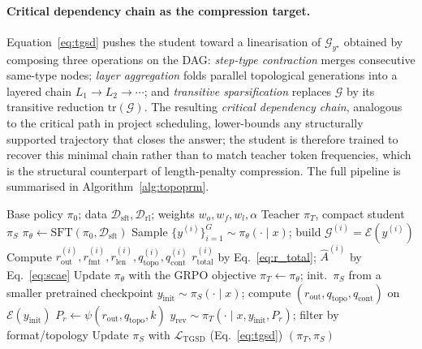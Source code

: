 \paragraph{Critical dependency chain as the compression target.}
Equation~\eqref{eq:tgsd} pushes the student toward a linearisation of $\mathcal{G}_{y^{\star}}$ obtained by composing three operations on the DAG: \emph{step-type contraction} merges consecutive same-type nodes; \emph{layer aggregation} folds parallel topological generations into a layered chain $L_1\!\to\!L_2\!\to\!\cdots$; and \emph{transitive sparsification} replaces $\mathcal{G}$ by its transitive reduction $\mathrm{tr}(\mathcal{G})$. The resulting \emph{critical dependency chain}, analogous to the critical path in project scheduling, lower-bounds any structurally supported trajectory that closes the answer; the student is therefore trained to recover this minimal chain rather than to match teacher token frequencies, which is the structural counterpart of length-penalty compression. The full \method pipeline is summarised in Algorithm~\ref{alg:topoprm}.

\begin{algorithm}[t]
\small
\caption{\framework Training Pipeline}
\label{alg:topoprm}
\begin{algorithmic}[1]
\Require Base policy $\pi_0$; data $\mathcal{D}_{\mathrm{sft}},\mathcal{D}_{\mathrm{rl}}$; weights $w_o,w_f,w_l,\alpha$
\Ensure Teacher $\pi_T$, compact student $\pi_S$
\State $\pi_\theta\!\leftarrow\!\mathrm{SFT}(\pi_0,\mathcal{D}_{\mathrm{sft}})$ 
 
  \State Sample $\{y^{(i)}\}_{i=1}^{G}\!\sim\!\pi_\theta(\cdot\!\mid\!x)$; build $\mathcal{G}^{(i)}\!=\!\mathcal{E}(y^{(i)})$
  \State Compute $r_{\mathrm{out}}^{(i)},r_{\mathrm{fmt}}^{(i)},r_{\mathrm{len}}^{(i)},q_{\mathrm{topo}}^{(i)},q_{\mathrm{cont}}^{(i)}$
  \State $r_{\mathrm{total}}^{(i)}$ by Eq.~\ref{eq:r_total}; $\widehat{A}^{(i)}$ by Eq.~\ref{eq:scae}
  \State Update $\pi_\theta$ with the GRPO objective
\EndFor
\State $\pi_T\!\leftarrow\!\pi_\theta$; init.\ $\pi_S$ from a smaller pretrained checkpoint
 
  \State $y_{\mathrm{init}}\!\sim\!\pi_S(\cdot\!\mid\!x)$; compute $(r_{\mathrm{out}},q_{\mathrm{topo}},q_{\mathrm{cont}})$ on $\mathcal{E}(y_{\mathrm{init}})$
  \State $P_r\!\leftarrow\!\psi(r_{\mathrm{out}},q_{\mathrm{topo}},k)$
  \State $y_{\mathrm{rev}}\!\sim\!\pi_T(\cdot\!\mid\!x,y_{\mathrm{init}},P_r)$; filter by format/topology
  \State Update $\pi_S$ with $\mathcal{L}_{\mathrm{TGSD}}$ (Eq.~\ref{eq:tgsd})
\EndFor
\State \Return $(\pi_T,\pi_S)$
\end{algorithmic}
\end{algorithm}